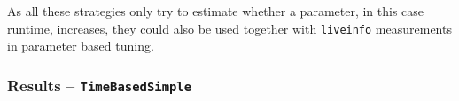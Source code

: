 \documentclass[]{article}
\begin{document}
As all these strategies only try to estimate whether a parameter, in this case runtime, increases, they could also be used together with \texttt{liveinfo} measurements in parameter based tuning.



%
%
%
%
%

\subsubsection{Results -- \texttt{TimeBasedSimple}}
\end{document}
